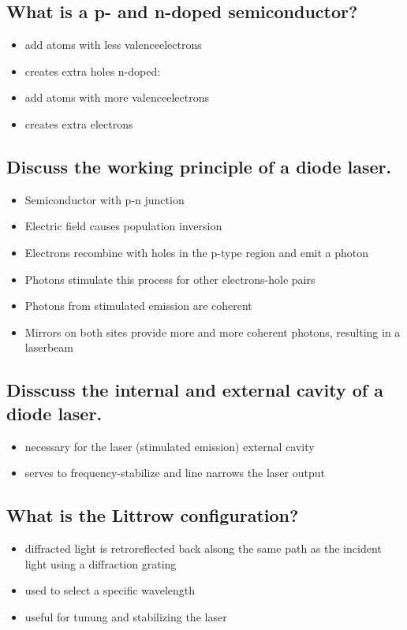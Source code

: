 \subsection{What is a p- and n-doped semiconductor?}
\begin{itemize}
    p-doped:
    \item add atoms with less valenceelectrons
    \item creates extra holes
    n-doped:
    \item add atoms with more valenceelectrons
    \item creates extra electrons
\end{itemize}

\subsection{Discuss the working principle of a diode laser.}
\begin{itemize}
    \item Semiconductor with p-n junction
    \item Electric field causes population inversion
    \item Electrons recombine with holes in the p-type region and emit a photon
    \item Photons stimulate this process for other electrons-hole pairs
    \item Photons from stimulated emission are coherent
    \item Mirrors on both sites provide more and more coherent photons, resulting in a laserbeam
\end{itemize}
\subsection{Disscuss the internal and external cavity of a diode laser.}
\begin{itemize}
    internal cavity
    \item necessary for the laser (stimulated emission)
    external cavity
    \item serves to  frequency-stabilize and line narrows the laser output
\end{itemize}
\subsection{What is the Littrow configuration?}
\begin{itemize}
    \item diffracted light is retroreflected back alsong the same path as the 
    incident light using a diffraction grating
    \item used to select a specific wavelength
    \item useful for tunung and stabilizing the laser
\end{itemize}

